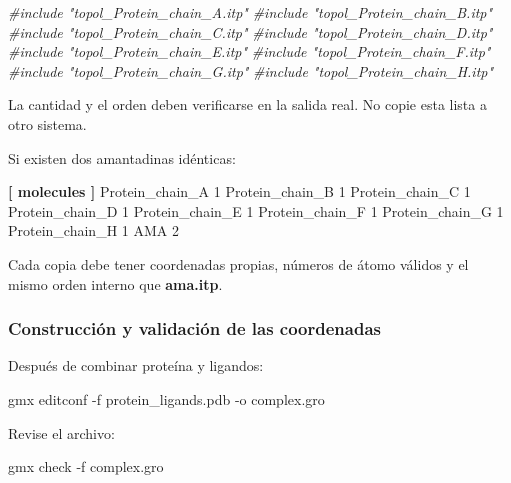 \documentclass[
  spanish,
  11pt,
  a4paper]{article}
\newenvironment{Shaded}{\begin{snugshade}}{\end{snugshade}}
\newcommand{\AttributeTok}[1]{\textcolor[rgb]{0.13,0.29,0.53}{#1}}
\newcommand{\CommentTok}[1]{\textcolor[rgb]{0.56,0.35,0.01}{\textit{#1}}}
\newcommand{\DataTypeTok}[1]{\textcolor[rgb]{0.13,0.29,0.53}{#1}}
\newcommand{\ExtensionTok}[1]{#1}
\newcommand{\KeywordTok}[1]{\textcolor[rgb]{0.13,0.29,0.53}{\textbf{#1}}}
\newcommand{\NormalTok}[1]{#1}
\begin{document}
\begin{Shaded}
\begin{Highlighting}[]
\CommentTok{\#include "topol\_Protein\_chain\_A.itp"}
\CommentTok{\#include "topol\_Protein\_chain\_B.itp"}
\CommentTok{\#include "topol\_Protein\_chain\_C.itp"}
\CommentTok{\#include "topol\_Protein\_chain\_D.itp"}
\CommentTok{\#include "topol\_Protein\_chain\_E.itp"}
\CommentTok{\#include "topol\_Protein\_chain\_F.itp"}
\CommentTok{\#include "topol\_Protein\_chain\_G.itp"}
\CommentTok{\#include "topol\_Protein\_chain\_H.itp"}
\end{Highlighting}
\end{Shaded}

La cantidad y el orden deben verificarse en la salida real. No copie
esta lista a otro sistema.

Si existen dos amantadinas idénticas:

\begin{Shaded}
\begin{Highlighting}[]
\KeywordTok{[ molecules ]}
\DataTypeTok{Protein\_chain\_A    1}
\DataTypeTok{Protein\_chain\_B    1}
\DataTypeTok{Protein\_chain\_C    1}
\DataTypeTok{Protein\_chain\_D    1}
\DataTypeTok{Protein\_chain\_E    1}
\DataTypeTok{Protein\_chain\_F    1}
\DataTypeTok{Protein\_chain\_G    1}
\DataTypeTok{Protein\_chain\_H    1}
\DataTypeTok{AMA                2}
\end{Highlighting}
\end{Shaded}

Cada copia debe tener coordenadas propias, números de átomo válidos y el
mismo orden interno que \textbf{ama.itp}.

\subsubsection{Construcción y validación de las
coordenadas}\label{construcciuxf3n-y-validaciuxf3n-de-las-coordenadas}

Después de combinar proteína y ligandos:

\begin{Shaded}
\begin{Highlighting}[]
\ExtensionTok{gmx}\NormalTok{ editconf     }\AttributeTok{{-}f}\NormalTok{ protein\_ligands.pdb     }\AttributeTok{{-}o}\NormalTok{ complex.gro}
\end{Highlighting}
\end{Shaded}

Revise el archivo:

\begin{Shaded}
\begin{Highlighting}[]
\ExtensionTok{gmx}\NormalTok{ check }\AttributeTok{{-}f}\NormalTok{ complex.gro}
\end{Highlighting}
\end{Shaded}
\end{document}
